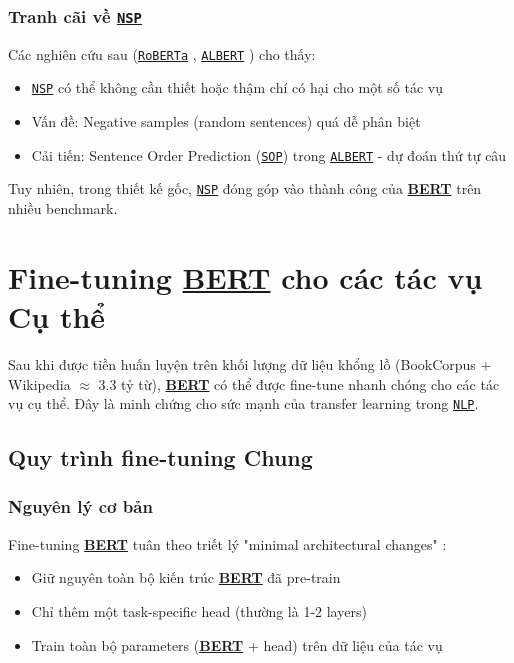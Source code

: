\subsubsection{Tranh cãi về \hyperref[acro:nsp]{\texttt{NSP}}}
Các nghiên cứu sau (\hyperref[acro:roberta]{\texttt{RoBERTa}} \cite{liu2019roberta}, \hyperref[acro:albert]{\texttt{ALBERT}} \cite{lan2019albert}) cho thấy:
\begin{itemize}
    \item \hyperref[acro:nsp]{\texttt{NSP}} có thể không cần thiết hoặc thậm chí có hại cho một số tác vụ
    \item Vấn đề: Negative samples (random sentences) quá dễ phân biệt
    \item Cải tiến: Sentence Order Prediction (\hyperref[acro:sop]{\texttt{SOP}}) trong \hyperref[acro:albert]{\texttt{ALBERT}} \cite{lan2019albert} - dự đoán thứ tự câu
\end{itemize}

Tuy nhiên, trong thiết kế gốc, \hyperref[acro:nsp]{\texttt{NSP}} đóng góp vào thành công của \hyperref[acro:bert]{\textbf{BERT}} trên nhiều benchmark.
\section{Fine-tuning \hyperref[acro:bert]{\textbf{BERT}} cho các tác vụ Cụ thể}
\label{sec:fine_tuning_bert}
Sau khi được tiền huấn luyện trên khối lượng dữ liệu khổng lồ (BookCorpus + Wikipedia $\approx$ 3.3 tỷ từ), \hyperref[acro:bert]{\textbf{BERT}} có thể được fine-tune nhanh chóng cho các tác vụ cụ thể.
Đây là minh chứng cho sức mạnh của transfer learning trong \hyperref[acro:nlp]{\texttt{NLP}}.
\subsection{Quy trình fine-tuning Chung}
\label{ssec:quy_trinh_tinh_chinh}

\subsubsection{Nguyên lý cơ bản}
Fine-tuning \hyperref[acro:bert]{\textbf{BERT}} tuân theo triết lý "minimal architectural changes" \cite{devlin2018bert}:
\begin{itemize}
    \item Giữ nguyên toàn bộ kiến trúc \hyperref[acro:bert]{\textbf{BERT}} đã pre-train
    \item Chỉ thêm một task-specific head (thường là 1-2 layers)
    \item Train toàn bộ parameters (\hyperref[acro:bert]{\textbf{BERT}} + head) trên dữ liệu của tác vụ
\end{itemize}


